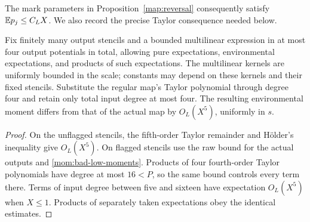 The mark parameters in Proposition~\ref{map:reversal} consequently
satisfy $\mathbb E p_j\le C_LX$.  We also record the precise Taylor consequence
needed below.

\begin{corollary}
\label{mom:taylor-substitution}
Fix finitely many output stencils and a bounded multilinear expression
in at most four output potentials in total, allowing pure expectations,
environmental expectations, and products of such expectations.
The multilinear kernels are uniformly bounded in the scale; constants
may depend on these kernels and their fixed stencils.
Substitute the regular map's Taylor polynomial through degree four
and retain only total input degree at most four.  The resulting
environmental moment differs from that of the actual map by
$O_L(X^5)$, uniformly in $s$.
\end{corollary}

\begin{proof}
On the unflagged stencils, the fifth-order Taylor remainder and
H\"older's inequality give $O_L(X^5)$.  On flagged stencils use the
raw bound for the actual outputs and
\eqref{mom:bad-low-moments}.  Products of four fourth-order Taylor
polynomials have degree at most $16<P$, so the same bound controls
every term there.  Terms of input degree between five and sixteen
have expectation $O_L(X^5)$ when $X\le1$.  Products of separately
taken expectations obey the identical estimates.
\end{proof}
